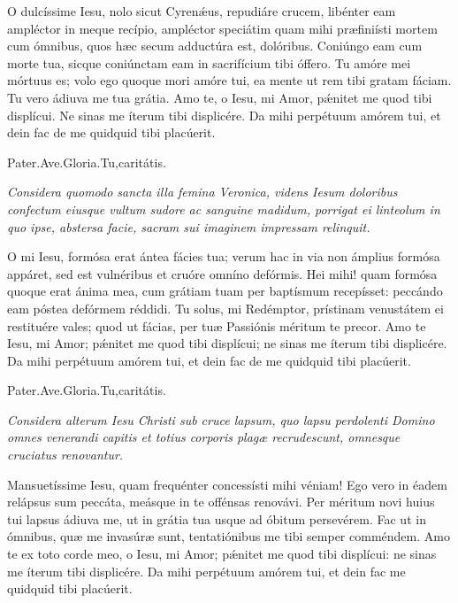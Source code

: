 \documentclass[12pt,a6paper]{book}
\newcommand{\V}{\textbf{V.} }
\newcommand{\R}{\textbf{R.} }
\newcommand{\officiumtitle}[1]{\subsection*{\parbox{\linewidth}{\centering\textbf{\textit{#1}}}}}
\newcommand{\centeredtext}[1]{\parbox{\linewidth}{\centering\textit{#1}}}
\begin{document}
\begin{sloppy}
O dulcíssime Iesu, nolo sicut Cyrenǽus, repudiáre crucem, libénter eam ampléctor in meque recípio, ampléctor speciátim quam mihi præfiniísti mortem cum ómnibus, quos hæc secum adductúra est, dolóribus. Coniúngo eam cum morte tua, sicque coniúnctam eam in sacrifícium tibi óffero. Tu amóre mei mórtuus es; volo ego quoque mori amóre tui, ea mente ut rem tibi gratam fáciam. Tu vero ádiuva me tua grátia. Amo te, o Iesu, mi Amor, pǽnitet me quod tibi displícui. Ne sinas me íterum tibi displicére. Da mihi perpétuum amórem tui, et dein fac de me quidquid tibi placúerit.

Pater.Ave.Gloria.Tu,caritátis.


\textit{Considera quomodo sancta illa femina Veronica, videns Iesum doloribus confectum eiusque vultum sudore ac sanguine madidum, porrigat ei linteolum in quo ipse, abstersa facie, sacram sui imaginem impressam relinquit.}

O mi Iesu, formósa erat ántea fácies tua; verum hac in via non ámplius formósa appáret, sed est vulnéribus et cruóre omníno defórmis. Hei mihi! quam formósa quoque erat ánima mea, cum grátiam tuam per baptísmum recepísset: peccándo eam póstea defórmem réddidi. Tu solus, mi Redémptor, prístinam venustátem ei restituére vales; quod ut fácias, per tuæ Passiónis méritum te precor. Amo te Iesu, mi Amor; pǽnitet me quod tibi displícui; ne sinas me íterum tibi displicére. Da mihi perpétuum amórem tui, et dein fac de me quidquid tibi placúerit.

Pater.Ave.Gloria.Tu,caritátis.


\textit{Considera alterum Iesu Christi sub cruce lapsum, quo lapsu perdolenti Domino omnes venerandi capitis et totius corporis plagæ recrudescunt, omnesque cruciatus renovantur.}

Mansuetíssime Iesu, quam frequénter concessísti mihi véniam! Ego vero in éadem relápsus sum peccáta, meásque in te offénsas renovávi. Per méritum novi huius tui lapsus ádiuva me, ut in grátia tua usque ad óbitum persevérem. Fac ut in ómnibus, quæ me invasúræ sunt, tentatiónibus me tibi semper comméndem. Amo te ex toto corde meo, o Iesu, mi Amor; pǽnitet me quod tibi displícui: ne sinas me íterum tibi displicére. Da mihi perpétuum amórem tui, et dein fac me quidquid tibi placúerit.


\end{sloppy}
\end{document}

